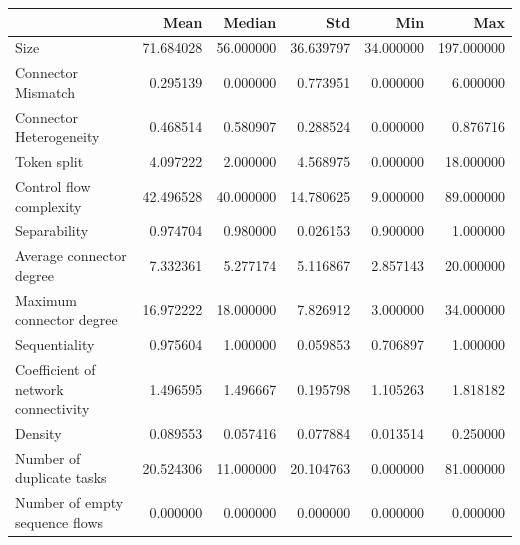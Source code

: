 \documentclass[a4paper]{article}
\begin{document}
\begin{center}
\begin{tabular}{lrrrrr}
\toprule
 & Mean & Median & Std & Min & Max \\
\midrule
Size & 71.684028 & 56.000000 & 36.639797 & 34.000000 & 197.000000 \\
Connector Mismatch & 0.295139 & 0.000000 & 0.773951 & 0.000000 & 6.000000 \\
Connector Heterogeneity & 0.468514 & 0.580907 & 0.288524 & 0.000000 & 0.876716 \\
Token split & 4.097222 & 2.000000 & 4.568975 & 0.000000 & 18.000000 \\
Control flow complexity & 42.496528 & 40.000000 & 14.780625 & 9.000000 & 89.000000 \\
Separability & 0.974704 & 0.980000 & 0.026153 & 0.900000 & 1.000000 \\
Average connector degree & 7.332361 & 5.277174 & 5.116867 & 2.857143 & 20.000000 \\
Maximum connector degree & 16.972222 & 18.000000 & 7.826912 & 3.000000 & 34.000000 \\
Sequentiality & 0.975604 & 1.000000 & 0.059853 & 0.706897 & 1.000000 \\
Coefficient of network connectivity & 1.496595 & 1.496667 & 0.195798 & 1.105263 & 1.818182 \\
Density & 0.089553 & 0.057416 & 0.077884 & 0.013514 & 0.250000 \\
Number of duplicate tasks & 20.524306 & 11.000000 & 20.104763 & 0.000000 & 81.000000 \\
Number of empty sequence flows & 0.000000 & 0.000000 & 0.000000 & 0.000000 & 0.000000 \\
\bottomrule
\end{tabular}
\end{center}
\end{document}
